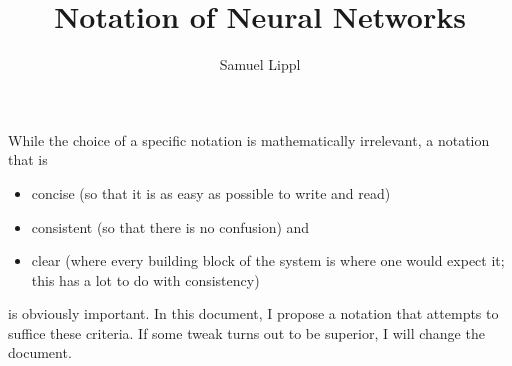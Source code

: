 \documentclass[a4paper,11pt]{article}
\author{Samuel Lippl}
\title{Notation of Neural Networks}
\begin{document}
\renewcommand{\abstractname}{\vspace{-\baselineskip}}
\theoremstyle{change} %
\theoremheaderfont{\normalfont\scshape}
\theorembodyfont{\normalfont}
\newtheorem{Def}{Definition}[section]
\newtheorem{The}[Def]{Theorem}
\newtheorem{Lem}[Def]{Lemma}
\newtheorem{Pro}[Def]{Proposition}
\newtheorem{Kor}[Def]{Korollar}
\newtheorem{Bem}[Def]{Bemerkung}
\newtheorem{Not}[Def]{Notation}
\newtheorem{Bei}[Def]{Example}
\newtheorem{Ax}[Def]{Axiom}
\newtheorem{Con}[Def]{Condition}
\newtheorem{Hyp}[Def]{Hypothesis}
\newtheorem{OP}{Open Problem}
\theoremseparator{}
\newtheorem{Abs}[Def]{}
\theoremstyle{nonumberplain}
\theoremheaderfont{\normalfont\itshape}
\theoremsymbol{$\square$}
\newtheorem{Bew}{Proof}
\theoremstyle{change}
\theoremsymbol{}
\theoremheaderfont{\normalfont\scshape}
\newtheorem{BLem}[Def]{Lemma}
\theoremstyle{plain}
\theoremheaderfont{\normalfont\itshape}
\newtheorem{HLem}{Sublemma}[Def]
\newtheorem{BAbs}[HLem]{}
\theoremstyle{nonumberplain}
\theoremheaderfont{\normalfont\itshape}
\theoremsymbol{$\triangle$}
\newtheorem{BBew}{Proof}
\maketitle
\tableofcontents
While the choice of a specific notation is mathematically irrelevant, a notation that is
\begin{itemize}
\item
concise (so that it is as easy as possible to write and read)
\item
consistent (so that there is no confusion) and
\item
clear (where every building block of the system is where one would expect it; this has a lot to do with consistency)
\end{itemize}
is obviously important. In this document, I propose a notation that attempts to suffice these criteria. If some tweak turns out to be superior, I will change the document.
\end{document}

